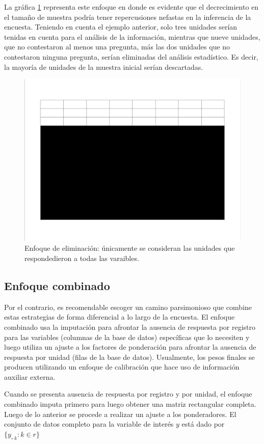 \documentclass[
  12pt,
]{book}
\begin{document}
La gráfica \ref{fig:figelimtotal} representa este enfoque en donde es evidente que el decrecimiento en el tamaño de muestra podría tener repercusiones nefastas en la inferencia de la encuesta. Teniendo en cuenta el ejemplo anterior, solo tres unidades serían tenidas en cuenta para el análisis de la información, mientras que nueve unidades, que no contestaron al menos una pregunta, más las dos unidades que no contestaron ninguna pregunta, serían eliminadas del análisis estadístico. Es decir, la mayoría de unidades de la muestra inicial serían descartadas.

\begin{figure}
\includegraphics[width=0.5\linewidth]{Pics/j2} \caption{Enfoque de eliminación: únicamente se consideran las unidades que respondedieron a todas las varaibles.}\label{fig:figelimtotal}
\end{figure}

\hypertarget{enfoque-combinado}{%
\subsection{Enfoque combinado}\label{enfoque-combinado}}

Por el contrario, es recomendable escoger un camino parsimonioso que combine estas estrategias de forma diferencial a lo largo de la encuesta. El enfoque combinado usa la imputación para afrontar la ausencia de respuesta por registro para las variables (columnas de la base de datos) específicas que lo necesiten y luego utiliza un ajuste a los factores de ponderación para afrontar la ausencia de respuesta por unidad (filas de la base de datos). Usualmente, los pesos finales se producen utilizando un enfoque de calibración que hace uso de información auxiliar externa.

Cuando se presenta ausencia de respuesta por registro y por unidad, el enfoque combinado imputa primero para luego obtener una matriz rectangular completa. Luego de lo anterior se procede a realizar un ajuste a los ponderadores. El conjunto de datos completo para la variable de interés \(y\) está dado por \(\{y_{\circ \  k}: k\in r\}\)
\end{document}
